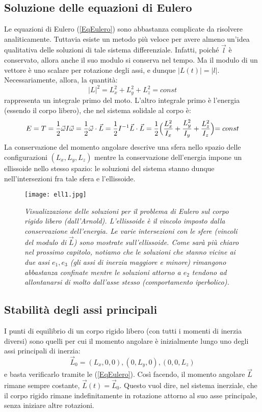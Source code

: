 \documentclass[a4paper,openany]{article}
\begin{document}
	\subsection{Soluzione delle equazioni di Eulero}
	Le equazioni di Eulero (\ref{EqEulero}) sono abbastanza complicate da risolvere analiticamente. Tuttavia esiste un metodo più veloce per avere almeno un'idea qualitativa delle soluzioni di tale sistema differenziale. Infatti, poiché $\vec{l}$ è conservato, allora anche il suo modulo si conserva nel tempo. Ma il modulo di un vettore è uno scalare per rotazione degli assi, e dunque $|L(t)| = |l|$. Necessariamente, allora, la quantità:
	$$
	|L|^{2} = L_x^2 + L_y^2 +L_z^2 = const
	$$
	rappresenta un integrale primo del moto. L'altro integrale primo è l'energia (essendo il corpo libero), che nel sistema solidale al corpo è:
	$$
	E = T = \dfrac{1}{2}\vec{\omega}I\vec{\omega} = \dfrac{1}{2}\vec{\omega}\cdot\vec{L} = \dfrac{1}{2}I^{-1}\vec{L}\cdot\vec{L} =  \dfrac{1}{2}\Bigl(\dfrac{L_x^2}{I_x} +\dfrac{L_y^2}{I_y}+\dfrac{L_z^2}{I_z}\Bigl) = const
	$$
	La conservazione del momento angolare descrive una sfera nello spazio delle configurazioni $(L_x,L_y,L_z)$ mentre la conservazione dell'energia impone un ellissoide nello stesso spazio: le soluzioni del sistema stanno dunque nell'intersezioni fra tale sfera e l'ellissoide.
\begin{figure}[H]
	\centering
	\texttt{[image: ell1.jpg]}
	\caption{\textit{Visualizzazione delle soluzioni per il problema di Eulero sul corpo rigido libero (dall'Arnold). L'ellissoide è il vincolo imposto dalla conservazione dell'energia. Le varie intersezioni con le sfere (vincoli del modulo di $\vec{L}$) sono mostrate sull'ellissoide. Come sarà più chiaro nel prossimo capitolo, notiamo che le soluzioni che stanno vicine ai due assi $e_1, e_3$ (gli assi di inerzia maggiore e minore) rimangono abbastanza confinate mentre le soluzioni attorno a $e_2$ tendono ad allontanarsi di molto dall'asse stesso (comportamento iperbolico).}}
\end{figure}
	\subsection{Stabilità degli assi principali}
	I punti di equilibrio di un corpo rigido libero (con tutti i momenti di inerzia diversi) sono quelli per cui il momento angolare è inizialmente lungo uno degli assi principali di inerzia:
	$$
	\vec{L}_0 = (L_x,0,0), (0,L_y,0), (0,0,L_z)
	$$
	e basta verificarlo tramite le (\ref{EqEulero}). Così facendo, il momento angolare $\vec{L}$ rimane sempre costante, $\vec{L}(t) = \vec{L}_0$. Questo vuol dire, nel sistema inerziale, che il corpo rigido rimane indefinitamente in rotazione attorno al suo asse principale, senza iniziare altre rotazioni.
	
\end{document}
